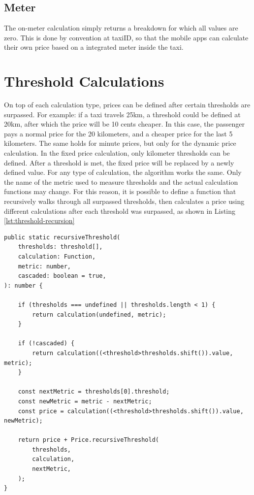 \subsection{Meter}
The on-meter calculation simply returns a breakdown for which all values are zero. This is done by convention at taxiID, so that the mobile apps can calculate their own price based on a integrated meter inside the taxi.


\section{Threshold Calculations}
On top of each calculation type, prices can be defined after certain thresholds are surpassed. For example: if a taxi travels 25km, a threshold could be defined at 20km, after which the price will be 10 cents cheaper. In this case, the passenger pays a normal price for the 20 kilometers, and a cheaper price for the last 5 kilometers. The same holds for minute prices, but only for the dynamic price calculation. In the fixed price calculation, only kilometer thresholds can be defined. After a threshold is met, the fixed price will be replaced by a newly defined value. For any type of calculation, the algorithm works the same. Only the name of the metric used to measure thresholds and the actual calculation functions may change. For this reason, it is possible to define a function that recursively walks through all surpassed thresholds, then calculates a price using different calculations after each threshold was surpassed, as shown in Listing \ref{lst:threshold-recursion}

\begin{lstlisting}[caption={Recursive threshold calculation.}, label={lst:threshold-recursion}]
public static recursiveThreshold(
	thresholds: threshold[],
	calculation: Function,
	metric: number,
	cascaded: boolean = true,
): number {

	if (thresholds === undefined || thresholds.length < 1) {
		return calculation(undefined, metric);
	}

	if (!cascaded) {
		return calculation((<threshold>thresholds.shift()).value, metric);
	}

	const nextMetric = thresholds[0].threshold;
	const newMetric = metric - nextMetric;
	const price = calculation((<threshold>thresholds.shift()).value, newMetric);

	return price + Price.recursiveThreshold(
		thresholds,
		calculation,
		nextMetric,
	);
}
\end{lstlisting}

